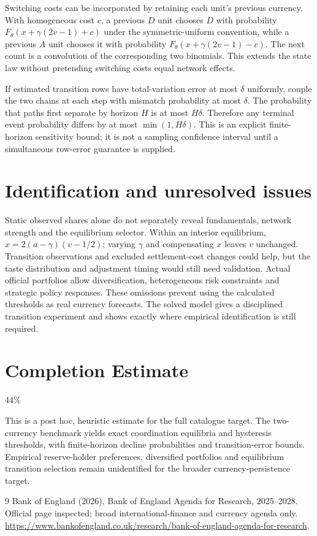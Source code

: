 \documentclass[11pt]{article}
\begin{document}
Switching costs can be incorporated by retaining each unit's previous currency. With homogeneous cost $c$, a previous $D$ unit chooses $D$ with probability $F_\theta(x+\gamma(2v-1)+c)$ under the symmetric-uniform convention, while a previous $A$ unit chooses it with probability $F_\theta(x+\gamma(2v-1)-c)$. The next count is a convolution of the corresponding two binomials. This extends the state law without pretending switching costs equal network effects.

If estimated transition rows have total-variation error at most $\delta$ uniformly, couple the two chains at each step with mismatch probability at most $\delta$. The probability that paths first separate by horizon $H$ is at most $H\delta$. Therefore any terminal event probability differs by at most $\min(1,H\delta)$. This is an explicit finite-horizon sensitivity bound; it is not a sampling confidence interval until a simultaneous row-error guarantee is supplied.

\section*{Identification and unresolved issues}
Static observed shares alone do not separately reveal fundamentals, network strength and the equilibrium selector. Within an interior equilibrium, $x=2(a-\gamma)(v-1/2)$; varying $\gamma$ and compensating $x$ leaves $v$ unchanged. Transition observations and excluded settlement-cost changes could help, but the taste distribution and adjustment timing would still need validation. Actual official portfolios allow diversification, heterogeneous risk constraints and strategic policy responses. These omissions prevent using the calculated thresholds as real currency forecasts. The solved model gives a disciplined transition experiment and shows exactly where empirical identification is still required.

\section{Completion Estimate}
44\%

This is a post hoc, heuristic estimate for the full catalogue target.
The two-currency benchmark yields exact coordination equilibria and hysteresis thresholds, with finite-horizon decline probabilities and transition-error bounds. Empirical reserve-holder preferences, diversified portfolios and equilibrium transition selection remain unidentified for the broader currency-persistence target.

\begin{thebibliography}{9}
 Bank of England (2026), Bank of England Agenda for Research, 2025--2028. Official page inspected; broad international-finance and currency agenda only. \url{https://www.bankofengland.co.uk/research/bank-of-england-agenda-for-research}.
\end{thebibliography}
\end{document}
